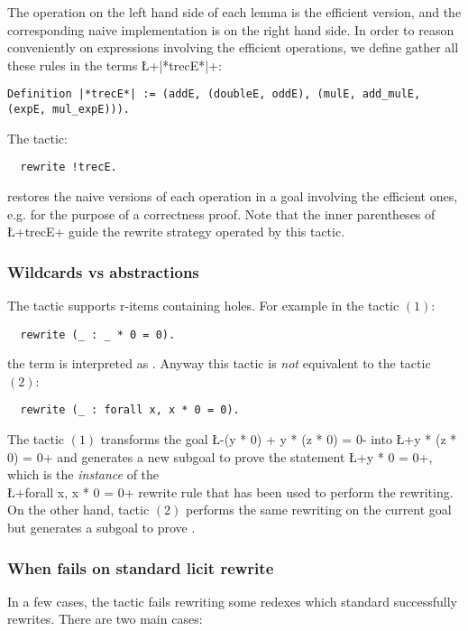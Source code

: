 The operation on the left hand side of each lemma is the efficient
version, and the corresponding naive implementation is on the right
hand side. In order to reason conveniently on expressions involving
the efficient operations, we define gather all these rules in the
terms \L+|*trecE*|+:
\begin{lstlisting}
Definition |*trecE*| := (addE, (doubleE, oddE), (mulE, add_mulE, (expE, mul_expE))).
\end{lstlisting}
The tactic:
\begin{lstlisting}
  rewrite !trecE.
\end{lstlisting}
restores the naive versions of each operation in a goal involving the
efficient ones, e.g. for the purpose of a correctness proof. Note that
the inner parentheses of \L+trecE+ guide the rewrite strategy operated
by this tactic.

\subsubsection*{Wildcards vs abstractions}
     The  tactic supports r-items containing holes. For example
      in the tactic $(1)$:
\begin{lstlisting}
  rewrite (_ : _ * 0 = 0).
\end{lstlisting}
      the term  is interpreted as .
      Anyway this tactic is \emph{not} equivalent to the tactic $(2)$:
\begin{lstlisting}
  rewrite (_ : forall x, x * 0 = 0).
\end{lstlisting}
      The tactic $(1)$ transforms the goal
      \L-(y * 0) + y * (z * 0) = 0- into \L+y * (z * 0) = 0+
      and generates a new subgoal to prove the statement \L+y * 0 = 0+,
      which is the \emph{instance} of the\\ \L+forall x, x * 0 = 0+
      rewrite rule that
      has been used to perform the rewriting. On the other hand, tactic
      $(2)$ performs the same rewriting on the current goal but generates a
      subgoal to prove .

\subsubsection*{When \ssr{}  fails on standard \Coq{} licit rewrite}
In a few cases, the \ssr{}  tactic fails
rewriting some redexes which standard \Coq{} successfully rewrites.
There are two main cases:

